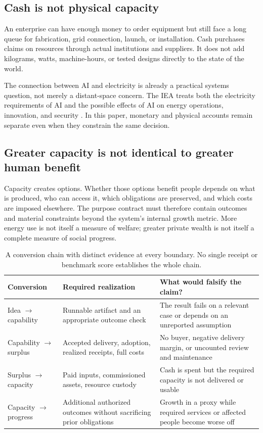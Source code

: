 \documentclass[11pt,letterpaper]{article}
\newcommand{\1}{\mathbf 1}
\theoremstyle{remark}\newtheorem{remark}{Remark}[section]
\begin{document}
\subsection{Cash is not physical capacity}
An enterprise can have enough money to order equipment but still face a long queue for fabrication, grid connection, launch, or installation. Cash purchases claims on resources through actual institutions and suppliers. It does not add kilograms, watts, machine-hours, or tested designs directly to the state of the world.

The connection between AI and electricity is already a practical systems question, not merely a distant-space concern. The IEA treats both the electricity requirements of AI and the possible effects of AI on energy operations, innovation, and security \citep{iea}. In this paper, monetary and physical accounts remain separate even when they constrain the same decision.

\subsection{Greater capacity is not identical to greater human benefit}
Capacity creates options. Whether those options benefit people depends on what is produced, who can access it, which obligations are preserved, and which costs are imposed elsewhere. The purpose contract must therefore contain outcomes and material constraints beyond the system's internal growth metric. More energy use is not itself a measure of welfare; greater private wealth is not itself a complete measure of social progress.

\begin{table}[htbp]\centering\small
\caption{A conversion chain with distinct evidence at every boundary. No single receipt or benchmark score establishes the whole chain.}
\begin{tabularx}{\linewidth}{@{}P{.19\linewidth}YY@{}}\toprule
Conversion & Required realization & What would falsify the claim?\\\midrule
Idea $\to$ capability & Runnable artifact and an appropriate outcome check & The result fails on a relevant case or depends on an unreported assumption\\
Capability $\to$ surplus & Accepted delivery, adoption, realized receipts, full costs & No buyer, negative delivery margin, or uncounted review and maintenance\\
Surplus $\to$ capacity & Paid inputs, commissioned assets, resource custody & Cash is spent but the required capacity is not delivered or usable\\
Capacity $\to$ progress & Additional authorized outcomes without sacrificing prior obligations & Growth in a proxy while required services or affected people become worse off\\\bottomrule
\end{tabularx}
\end{table}
\end{document}
